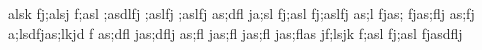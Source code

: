 alsk fj;alsj f;asl ;asdlfj ;aslfj ;aslfj as;dfl
ja;sl fj;asl fj;aslfj as;l fjas; fjas;flj as;fj
a;lsdfjas;lkjd f
as;dfl jas;dflj as;fl jas;fl jas;fl jas;flas
jf;lsjk f;asl fj;asl fjasdflj
